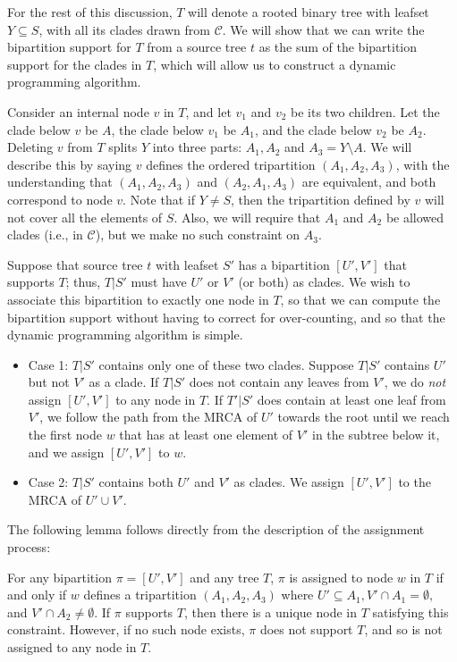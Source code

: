 For the rest of this discussion, $T$ will denote a rooted
binary
tree with leafset $Y \subseteq S$, with all its
clades drawn from $\mathcal{C}$.  We will show that we
can write the bipartition support for $T$ from a source tree
$t$ as the sum of the bipartition support for the clades in $T$,
which will allow us to construct a dynamic programming algorithm.

Consider an internal node $v$ in $T$, and let
$v_1$ and $v_2$ be its two children. 
Let the clade below $v$ be $A$, the clade
below $v_1$ be $A_1$, and the clade below $v_2$ be $A_2$.
Deleting $v$ from $T$ splits $Y$ 
into  three parts: $A_1, A_2$ and $A_3=Y \setminus A$.
We will describe this by saying $v$ defines
the ordered tripartition $(A_1, A_2,A_3)$,  with the  understanding
that $(A_1, A_2, A_3)$ and $(A_2, A_1, A_3)$ are
equivalent, and both correspond to node $v$. Note
that if $Y \neq S$, then
the tripartition defined by $v$ will not cover all the elements of $S$.
Also,  we will require that $A_1$ and $A_2$ be allowed clades (i.e., in $\mathcal{C}$),
but we make no such constraint on $A_3$.

Suppose that source tree $t$ with
leafset $S'$ has a bipartition $[U',V']$ that supports 
$T$; thus, $T|S'$ must have $U'$ or $V'$ (or both) as clades.
We wish to associate this bipartition to exactly one node in 
$T$, so that we can compute the bipartition support without having
to correct for over-counting, and so that the dynamic programming
algorithm is simple.

\begin{itemize}
\item[] Case 1: $T|S'$ contains only one of these two clades. Suppose
$T|S'$ contains $U'$ but not $V'$ as a clade.
If $T|S'$ does not contain any leaves from $V'$, we
do {\em not}
assign
$[U',V']$ to any node in $T$. 
If $T'|S'$ does contain at least one leaf from $V'$, we
follow the path from the MRCA of $U'$ towards the
root until we reach the first node $w$ that
has at least one element of $V'$ in the subtree below it, and
we assign $[U',V']$ to $w$.
\item[] Case 2: $T|S'$ contains both $U'$ and $V'$ as clades.
We assign
$[U',V']$ to 
the MRCA of $U' \cup V'$.
\end{itemize}

The following lemma follows directly from the
description of the assignment process:
\begin{lemma}
For any bipartition $\pi = [U',V']$ and any tree $T$, 
$\pi$ is assigned to
node
$w$ in $T$ if and only if $w$ defines a tripartition
$(A_1, A_2, A_3)$ where
$U' \subseteq A_1, V' \cap A_1 = \emptyset, $ and
$V' \cap A_2 \neq \emptyset$.
If $\pi$ supports $T$, then 
there is a unique node in $T$
satisfying this constraint. However,
if no such node exists, $\pi$
does not support $T$, and so is
not assigned to any node in $T$.
\label{fastrfs::lemma-tripartition}
\end{lemma}

